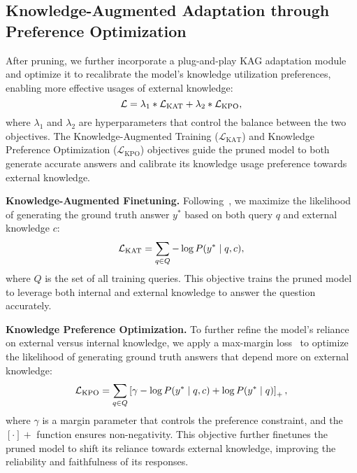 \subsection{Knowledge-Augmented Adaptation through Preference Optimization}
\label{sec:training}

After pruning, we further incorporate a plug-and-play KAG adaptation module~\cite{hu2021lora} and optimize it to recalibrate the model's knowledge utilization preferences, enabling more effective usages of external knowledge:
\begin{equation}\small 
\label{eq:final_loss}
    \mathcal{L} = \lambda_1 * \mathcal{L}_{\text{KAT}} + \lambda_2 *\mathcal{L}_{\text{KPO}},
\end{equation}
where $\lambda_1$ and $\lambda_2$ are hyperparameters that control the balance between the two objectives. The Knowledge-Augmented Training ($\mathcal{L}_{\text{KAT}}$) and Knowledge Preference Optimization ($\mathcal{L}_{\text{KPO}}$) objectives guide the pruned model to both generate accurate answers and calibrate its knowledge usage preference towards external knowledge.


\textbf{Knowledge-Augmented Finetuning.} Following~\citet{lin2023ra}, we maximize the likelihood of generating the ground truth answer $y^*$ based on both query $q$ and external knowledge $c$:
\begin{equation}\small
    \label{eq:sft_loss_w_context}
    \mathcal{L}_{\text{KAT}} = \sum_{q \in Q} -\log P(y^* \mid q, c),
\end{equation}
where $Q$ is the set of all training queries. This objective trains the pruned model to leverage both internal and external knowledge to answer the question accurately.

\textbf{Knowledge Preference Optimization.} To further refine the model's reliance on external versus internal knowledge, we apply a max-margin loss~\cite{david1963method} to optimize the likelihood of generating ground truth answers that depend more on external knowledge:
\begin{equation}\small
\label{eq:kc_loss}
    \mathcal{L}_{\text{KPO}} = \sum_{q \in Q} \left[ \gamma -\log P(y^* \mid q, c) +\log P(y^* \mid q)   \right]_+,
\end{equation}
where $\gamma$ is a margin parameter that controls the preference constraint, and the $[\cdot]+$ function ensures non-negativity. This objective further finetunes the pruned model to shift its reliance towards external knowledge, improving the reliability and faithfulness of its responses.


